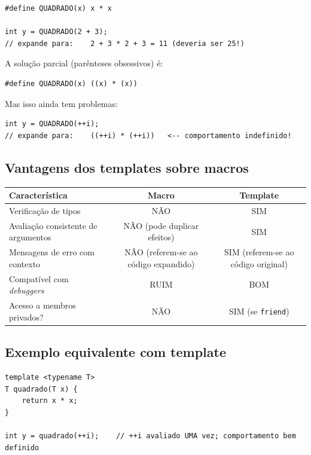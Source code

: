 \documentclass[11pt,a4paper]{article}
\begin{document}
\begin{lstlisting}[style=cppcode,numbers=none]
#define QUADRADO(x) x * x

int y = QUADRADO(2 + 3);
// expande para:    2 + 3 * 2 + 3 = 11 (deveria ser 25!)
\end{lstlisting}

A solu\c{c}\~ao parcial (par\^enteses obsessivos) \'e:

\begin{lstlisting}[style=cppcode,numbers=none]
#define QUADRADO(x) ((x) * (x))
\end{lstlisting}

Mas isso ainda tem problemas:

\begin{lstlisting}[style=cppcode,numbers=none]
int y = QUADRADO(++i);
// expande para:    ((++i) * (++i))   <-- comportamento indefinido!
\end{lstlisting}

\subsection*{Vantagens dos templates sobre macros}

\begin{center}
\renewcommand{\arraystretch}{1.3}
\begin{tabular}{|p{6cm}|c|c|}
\hline
\textbf{Caracter\'istica} & \textbf{Macro} & \textbf{Template} \\
\hline
Verifica\c{c}\~ao de tipos & N\~AO & SIM \\
\hline
Avalia\c{c}\~ao consistente de argumentos & N\~AO (pode duplicar efeitos) & SIM \\
\hline
Mensagens de erro com contexto & N\~AO (referem-se ao c\'odigo expandido) & SIM (referem-se ao c\'odigo original) \\
\hline
Compat\'ivel com \emph{debuggers} & RUIM & BOM \\
\hline
Acesso a membros privados? & N\~AO & SIM (se \texttt{friend}) \\
\hline
\end{tabular}
\end{center}

\subsection*{Exemplo equivalente com template}

\begin{lstlisting}[style=cppcode,numbers=none]
template <typename T>
T quadrado(T x) {
    return x * x;
}

int y = quadrado(++i);    // ++i avaliado UMA vez; comportamento bem definido
\end{lstlisting}
\end{document}
